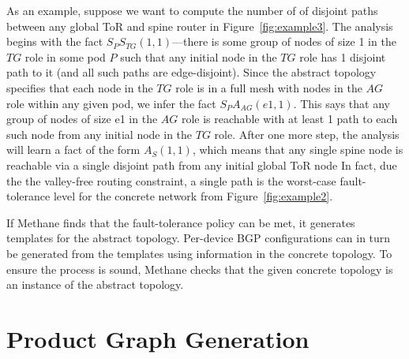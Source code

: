 \documentclass[numbers, 10pt, preprint]{sigplanconf}
\newcommand{\sysname}{{\small \sf Methane}\xspace}
\begin{document}
As an example, suppose we want to compute the number of of disjoint paths
between any
global ToR and spine router in Figure~\ref{fig:example3}.
The analysis begins with the fact
$S_P S_{TG} (1,1)$---there is some group of
nodes of size 1 in the $TG$ role in some pod $P$ such that any initial
node in the $TG$ role has 1 disjoint path to it (and all such paths are
edge-disjoint). Since the abstract topology specifies that each node in
the $TG$ role is in
a full mesh with nodes in the $AG$ role within any given pod, we
infer the fact $S_P A_{AG}(e1,1)$. This says that
any group of nodes of size e1 in the $AG$ role is reachable with at
least 1 path to each such node from any initial node in
the $TG$ role.
%
After one more step, the analysis will learn a fact of the form $A_{S}(1,1)$, which means that any single spine node is reachable via a single disjoint path from any initial global ToR node
In fact, due the the valley-free routing constraint, a single path is
the worst-case fault-tolerance level for the concrete network from
Figure~\ref{fig:example2}.

If \sysname finds that the fault-tolerance policy can be met, it generates templates for the abstract topology.  Per-device BGP configurations can in turn be generated from the templates
using information in the concrete topology. To ensure the process is sound,
\sysname checks that the given concrete topology is an instance of the abstract topology.

%
%
%


%
%
%
%

\section{Product Graph Generation}
\label{sec:language}

\end{document}
